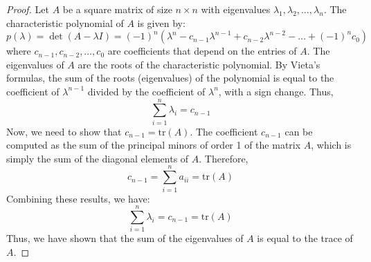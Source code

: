 \documentclass[openany]{book}
\begin{document}
\begin{proof}
    Let $A$ be a square matrix of size $n \times n$ with eigenvalues $\lambda_1, \lambda_2, \ldots, \lambda_n$. The characteristic polynomial of $A$ is given by:
    \[
    p(\lambda) = \det(A - \lambda I) = (-1)^n (\lambda^n - c_{n-1}\lambda^{n-1} + c_{n-2}\lambda^{n-2} - \ldots + (-1)^n c_0)
    \]
    where $c_{n-1}, c_{n-2}, \ldots, c_0$ are coefficients that depend on the entries of $A$. The eigenvalues of $A$ are the roots of the characteristic polynomial. By Vieta's formulas, the sum of the roots (eigenvalues) of the polynomial is equal to the coefficient of $\lambda^{n-1}$ divided by the coefficient of $\lambda^n$, with a sign change. Thus,
    \[
    \sum_{i=1}^{n} \lambda_i = c_{n-1}
    \]
    Now, we need to show that $c_{n-1} = \text{tr}(A)$. The coefficient $c_{n-1}$ can be computed as the sum of the principal minors of order 1 of the matrix $A$, which is simply the sum of the diagonal elements of $A$. Therefore,
    \[
    c_{n-1} = \sum_{i=1}^{n} a_{ii} = \text{tr}(A)
    \]
    Combining these results, we have:
    \[
    \sum_{i=1}^{n} \lambda_i = c_{n-1} = \text{tr}(A)
    \]
    Thus, we have shown that the sum of the eigenvalues of $A$ is equal to the trace of $A$.
\end{proof}
\end{document}
